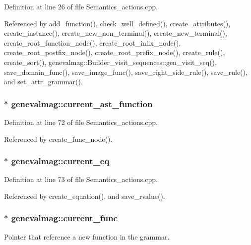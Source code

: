 Definition at line 26 of file Semantics\_\-actions.cpp.



Referenced by add\_\-function(), check\_\-well\_\-defined(), create\_\-attributes(), create\_\-instance(), create\_\-new\_\-non\_\-terminal(), create\_\-new\_\-terminal(), create\_\-root\_\-function\_\-node(), create\_\-root\_\-infix\_\-node(), create\_\-root\_\-postfix\_\-node(), create\_\-root\_\-prefix\_\-node(), create\_\-rule(), create\_\-sort(), genevalmag::Builder\_\-visit\_\-sequences::gen\_\-visit\_\-seq(), save\_\-domain\_\-func(), save\_\-image\_\-func(), save\_\-right\_\-side\_\-rule(), save\_\-rule(), and set\_\-attr\_\-grammar().

\hypertarget{namespacegenevalmag_a5d3b27c53cfad3c612dc56f1750c44a2}{
\subsubsection[{current\_\-ast\_\-function}]{$\ast$ {\bf genevalmag::current\_\-ast\_\-function}}}
\label{namespacegenevalmag_a5d3b27c53cfad3c612dc56f1750c44a2}


Definition at line 72 of file Semantics\_\-actions.cpp.



Referenced by create\_\-func\_\-node().

\hypertarget{namespacegenevalmag_ad81ea3b166738b52ec4a3b7ac291e64b}{
\subsubsection[{current\_\-eq}]{$\ast$ {\bf genevalmag::current\_\-eq}}}
\label{namespacegenevalmag_ad81ea3b166738b52ec4a3b7ac291e64b}


Definition at line 73 of file Semantics\_\-actions.cpp.



Referenced by create\_\-equation(), and save\_\-rvalue().

\hypertarget{namespacegenevalmag_a910b57b31dc9d8772d89a082d88f0c50}{
\subsubsection[{current\_\-func}]{$\ast$ {\bf genevalmag::current\_\-func}}}
\label{namespacegenevalmag_a910b57b31dc9d8772d89a082d88f0c50}
Pointer that reference a new function in the grammar. 

